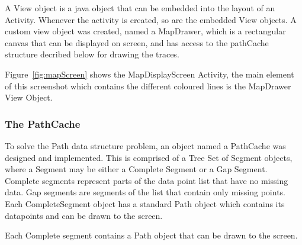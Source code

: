 A View object is a java object that can be embedded into the layout of an Activity. Whenever the activity is created, so are the embedded View objects. A custom view object was created, named a MapDrawer, which is a rectangular canvas that can be displayed on screen, and has access to the pathCache structure decribed below for drawing the traces.

Figure~\ref{fig:mapScreen} shows the MapDisplayScreen Activity, the main element of this screenshot which contains the different coloured lines is the MapDrawer View Object.

\subsubsection*{The PathCache}
To solve the Path data structure problem, an object named a PathCache was designed and implemented. This is comprised of a Tree Set of Segment objects, where a Segment may be either a Complete Segment or a Gap Segment. Complete segments represent parts of the data point list that have no missing data. Gap segments are segments of the list that contain only missing points. Each CompleteSegment object has a standard Path object which contains its datapoints and can be drawn to the screen.

Each Complete segment contains a Path object that can be drawn to the screen.

